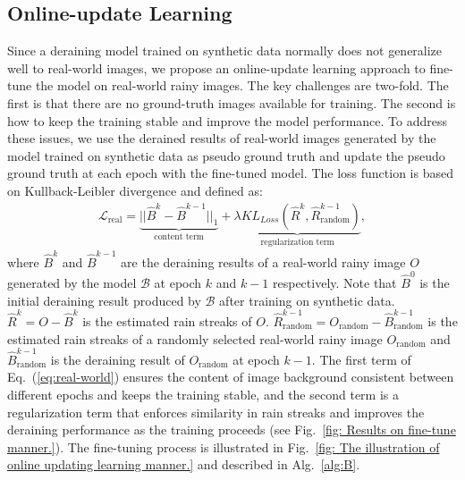 \documentclass[letterpaper]{article} %
\begin{document}
\subsection{Online-update Learning}\label{sec: Online Updating Scheme}
Since a deraining model trained on synthetic data normally does not generalize well to real-world images, we propose an online-update learning approach to fine-tune the model on real-world rainy images.
The key challenges are two-fold. The first is that there are no ground-truth images available for training.
The second is how to keep the training stable and improve the model performance.
To address these issues, we use the derained results of real-world images generated by the model trained on synthetic data as pseudo ground truth and update the pseudo ground truth at each epoch with the fine-tuned model. The loss function is based on Kullback-Leibler divergence and defined as:
\begin{equation}
\begin{array}{ll}
\mathcal{L}_{\text{real}} = \underbrace{||\hat{B}^{k}- \hat{B}^{k-1}||_{1}}_{\text{content term}} +
\underbrace{{\lambda KL_{Loss}(\hat{R}^{k}, \hat{R}^{k-1}_{\text{random}})}}_{\text{regularization term}},
\end{array}
\label{eq:real-world}
\end{equation}
where $\hat{B}^{k}$ and $\hat{B}^{k-1}$ are the deraining results of a real-world rainy image $O$ generated by the model $\mathcal{B}$ at epoch $k$ and $k-1$ respectively. Note that $\hat{B}^{0}$ is the initial deraining result produced by $\mathcal{B}$ after training on synthetic data.
$\hat{R}^{k}= O-\hat{B}^{k}$ is the estimated rain streaks of $O$. $\hat{R}^{k-1}_{\text{random}} = O_{\text{random}}-\hat{B}_{\text{random}}^{k-1}$ is the estimated rain streaks of a randomly selected real-world rainy image $O_{\text{random}}$ and $\hat{B}_{\text{random}}^{k-1}$ is the deraining result of $O_{\text{random}}$ at epoch $k-1$.
The first term of Eq.~(\ref{eq:real-world}) ensures the content of image background consistent between different epochs and keeps the training stable, and the second term is a regularization term that enforces similarity in rain streaks and improves the deraining performance as the training proceeds (see Fig.~\ref{fig: Results on fine-tune manner.}).
The fine-tuning process is illustrated in
Fig.~\ref{fig: The illustration of online updating learning manner.} and described in Alg.~\ref{alg:B}.
\end{document}

